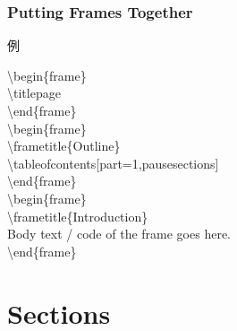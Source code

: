 \documentclass[aspectratio=1610,utf8]{beamer}
\begin{document}
\begin{frame}
  \frametitle{Putting Frames Together}

  \begin{block}{例}
    \tt \scriptsize

\textbackslash{}begin\{frame\}\\
\alert{\textbackslash{}titlepage}\\
\textbackslash{}end\{frame\}\\

\textbackslash{}begin\{frame\}\\
\alert{
\textbackslash{}frametitle\{Outline\}\\
\textbackslash{}tableofcontents[part=1,pausesections]
}\\
\textbackslash{}end\{frame\}\\

\textbackslash{}begin\{frame\}\\
\alert{\textbackslash{}frametitle\{Introduction\}}\\
Body text / code of the frame goes here.\\
\textbackslash{}end\{frame\}
    
  \end{block}
\end{frame}


\section{Sections}
\end{document}
